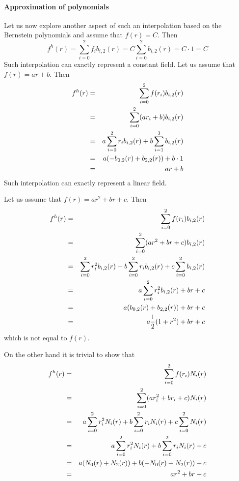 \paragraph{Approximation of polynomials}
Let us now explore another aspect of such an interpolation based on the Bernstein polynomials
and assume that $f(r)=C$. Then 
\[
f^h(r) = \sum_{i=0}^2 f_i b_{i,2}(r) = C \sum_{i=0}^2 b_{i,2}(r) = C \cdot 1 = C
\]
Such interpolation can exactly represent a constant field. 
Let us assume that $f(r)=ar+b$. Then 
\begin{eqnarray}
f^h(r) 
&=& \sum_{i=0}^2 f(r_i) b_{i,2}(r)  \nonumber\\
&=& \sum_{i=0}^2 (ar_i+b) b_{i,2}(r) \nonumber\\
&=& a\sum_{i=0}^2 r_i b_{i,2}(r) + b \sum_{i=1}^3 b_{i,2}(r) \nonumber\\
&=& a (-b_{0,2}(r)+b_{2,2}(r)) + b \cdot 1 \nonumber\\
&=& ar+b 
\end{eqnarray}
Such interpolation can exactly represent a linear field. 

Let us assume that $f(r)=ar^2+br+c$. Then 
\begin{eqnarray}
f^h(r) 
&=& \sum_{i=0}^2 f(r_i) b_{i,2}(r) \nonumber \\
&=& \sum_{i=0}^2 (ar^2+br+c) b_{i,2}(r) \nonumber\\
&=& \sum_{i=0}^2 r_i^2 b_{i,2}(r) + b \sum_{i=0}^2 r_i b_{i,2}(r) + c \sum_{i=0}^2 b_{i,2}(r) \nonumber\\
&=& a\sum_{i=0}^2 r_i^2 b_{i,2}(r) + br + c \nonumber\\
&=& a (b_{0,2}(r) + b_{2,2}(r)) + br + c \nonumber\\
&=& a\frac{1}{2}(1+r^2)  + br + c 
\end{eqnarray}
which is not equal to $f(r)$.

On the other hand it is trivial to show that 
\begin{eqnarray}
f^h(r) 
&=&  \sum_{i=0}^2 f(r_i) N_i(r) \nonumber \\
&=&  \sum_{i=0}^2   (ar_i^2+br_i+c)  N_i(r) \nonumber \\
&=&  a \sum_{i=0}^2  r_i^2 N_i(r) + b \sum_{i=0}^2 r_i  N_i(r) +  c \sum_{i=0}^2  N_i(r) \nonumber \\
&=&  a \sum_{i=0}^2  r_i^2 N_i(r) + b \sum_{i=0}^2 r_i  N_i(r) +  c \nonumber\\
&=&  a (N_0(r)+N_2(r)) + b (-N_0(r) +N_2(r)) +  c \nonumber\\
&=&  a r^2  + b r+ c 
\end{eqnarray}


